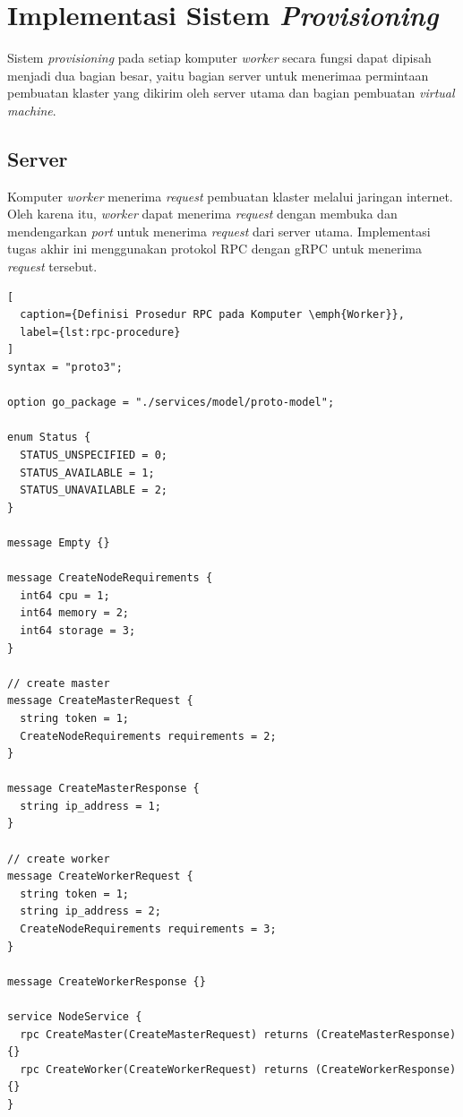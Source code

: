 \section{Implementasi Sistem \emph{Provisioning}}
\label{sec:implementasi-sistem-provisioning}

Sistem \emph{provisioning} pada setiap komputer \emph{worker} secara fungsi dapat dipisah
menjadi dua bagian besar, yaitu bagian server untuk menerimaa permintaan pembuatan klaster yang dikirim
oleh server utama dan bagian pembuatan \emph{virtual machine}.

\subsection{Server}
\label{sec:server}

Komputer \emph{worker} menerima \emph{request} pembuatan klaster melalui jaringan internet.
Oleh karena itu, \emph{worker} dapat menerima \emph{request} dengan membuka dan mendengarkan \emph{port}
untuk menerima \emph{request} dari server utama. Implementasi tugas akhir ini menggunakan protokol
RPC dengan gRPC untuk menerima \emph{request} tersebut.

\begin{lstlisting}[
  caption={Definisi Prosedur RPC pada Komputer \emph{Worker}},
  label={lst:rpc-procedure}
]
syntax = "proto3";

option go_package = "./services/model/proto-model";

enum Status {
  STATUS_UNSPECIFIED = 0;
  STATUS_AVAILABLE = 1;
  STATUS_UNAVAILABLE = 2;
}

message Empty {}

message CreateNodeRequirements {
  int64 cpu = 1;
  int64 memory = 2;
  int64 storage = 3;
}

// create master
message CreateMasterRequest {
  string token = 1;
  CreateNodeRequirements requirements = 2;
}

message CreateMasterResponse {
  string ip_address = 1;
}

// create worker
message CreateWorkerRequest {
  string token = 1;
  string ip_address = 2;
  CreateNodeRequirements requirements = 3;
}

message CreateWorkerResponse {}

service NodeService {
  rpc CreateMaster(CreateMasterRequest) returns (CreateMasterResponse) {}
  rpc CreateWorker(CreateWorkerRequest) returns (CreateWorkerResponse) {}
}
\end{lstlisting}

